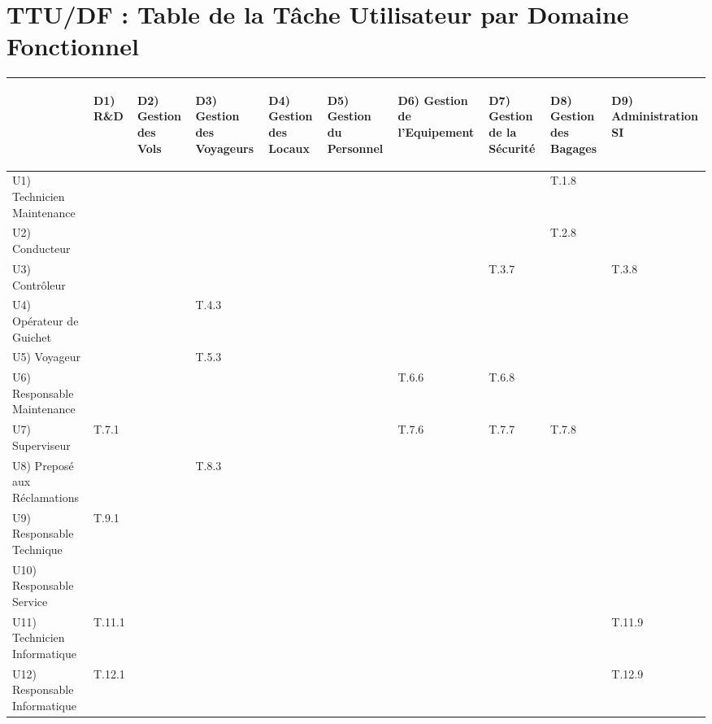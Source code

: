 \documentclass{article}
\begin{document}
\section {TTU/DF : Table de la T\^ache Utilisateur par Domaine Fonctionnel}


\begin {tabular} {| l | l | l | l | l | l | l | l | l | l | }

\hline
\begin{sideways}\end{sideways}
&\begin{sideways}D1) R\&D\end{sideways}
&\begin{sideways}D2) Gestion des Vols\end{sideways}
&\begin{sideways}D3) Gestion des Voyageurs\end{sideways}
&\begin{sideways}D4) Gestion des Locaux\end{sideways}
&\begin{sideways}D5) Gestion du Personnel\end{sideways}
&\begin{sideways}D6) Gestion de l'Equipement\end{sideways}
&\begin{sideways}D7) Gestion de la S\'ecurit\'e\end{sideways}
&\begin{sideways}D8) Gestion des Bagages\end{sideways}
&\begin{sideways}D9) Administration SI\end{sideways}\\
\hline
U1) Technicien Maintenance  & & & & & & & &T.1.8 &  \\
\hline
U2) Conducteur  & & & & & & & &T.2.8 &  \\
\hline
U3) Contr\^oleur  & & & & & & &T.3.7 & &T.3.8  \\
\hline
U4) Op\'erateur de Guichet  & & &T.4.3 & & & & & &  \\
\hline
U5) Voyageur  & & &T.5.3 & & & & & &  \\
\hline
U6) Responsable Maintenance  & & & & & &T.6.6 &T.6.8 &  &\\
\hline
U7) Superviseur  &T.7.1 & & & & &T.7.6 &T.7.7 &T.7.8 &\\
\hline
U8) Prepos\'e aux R\'eclamations  & & &T.8.3 & & & & & &\\
\hline
U9) Responsable Technique  &T.9.1 & & & & & & & &  \\
\hline
U10) Responsable Service  & & & & & & & & &  \\
\hline
U11) Technicien Informatique  &T.11.1 & & & & & & & &T.11.9  \\
\hline
U12) Responsable Informatique  &T.12.1 & & & & & & & &T.12.9  \\
\hline
\end {tabular}
\end{document}
